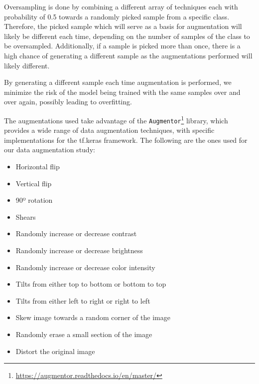     Oversampling is done by combining a different array of techniques each with probability of 0.5 towards a randomly picked sample from a specific class. Therefore, the picked sample which will serve as a basis for augmentation will likely be different each time, depending on the number of samples of the class to be oversampled. Additionally, if a sample is picked more than once, there is a high chance of generating a different sample as the augmentations performed will likely different. \par
    
    By generating a different sample each time augmentation is performed, we minimize the risk of the model being trained with the same samples over and over again, possibly leading to overfitting. \par 
    
    The augmentations used take advantage of the  \verb|Augmentor|\footnote{\url{https://augmentor.readthedocs.io/en/master/}} library, which provides a wide range of data augmentation techniques, with specific implementations for the tf.keras framework. The following are the ones used for our data augmentation study:
    
    \begin{itemize}
        \item Horizontal flip
        \item Vertical flip
        \item 90º rotation
        \item Shears
        \item Randomly increase or decrease contrast
        \item Randomly increase or decrease brightness
        \item Randomly increase or decrease color intensity
        \item Tilts from either top to bottom or bottom to top
        \item Tilts from either left to right or right to left
        \item Skew image towards a random corner of the image
        \item Randomly erase a small section of the image
        \item Distort the original image
    \end{itemize}
    
